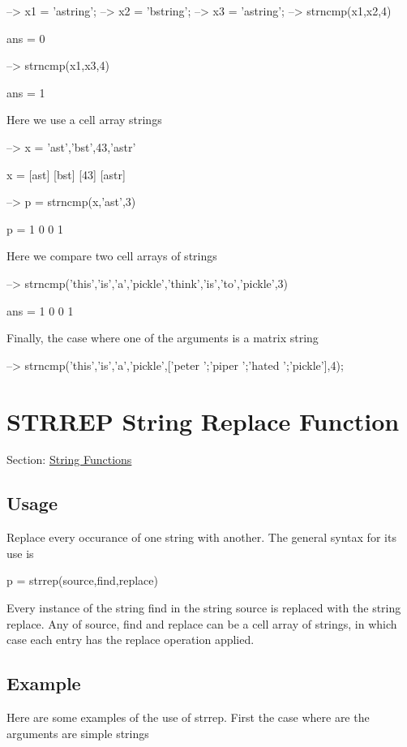 \begin{DoxyVerbInclude}
--> x1 = 'astring';
--> x2 = 'bstring';
--> x3 = 'astring';
--> strncmp(x1,x2,4)

ans = 
 0 

--> strncmp(x1,x3,4)

ans = 
 1 
\end{DoxyVerbInclude}


Here we use a cell array strings


\begin{DoxyVerbInclude}
--> x = {'ast','bst',43,'astr'}

x = 
 [ast] [bst] [43] [astr] 

--> p = strncmp(x,'ast',3)

p = 
 1 0 0 1 
\end{DoxyVerbInclude}


Here we compare two cell arrays of strings


\begin{DoxyVerbInclude}
--> strncmp({'this','is','a','pickle'},{'think','is','to','pickle'},3)

ans = 
 1 0 0 1 
\end{DoxyVerbInclude}


Finally, the case where one of the arguments is a matrix string


\begin{DoxyVerbInclude}
--> strncmp({'this','is','a','pickle'},['peter ';'piper ';'hated ';'pickle'],4);
\end{DoxyVerbInclude}
 \hypertarget{string_strrep}{}\section{S\-T\-R\-R\-E\-P String Replace Function}\label{string_strrep}
Section\-: \hyperlink{sec_string}{String Functions} \hypertarget{vtkwidgets_vtkxyplotwidget_Usage}{}\subsection{Usage}\label{vtkwidgets_vtkxyplotwidget_Usage}
Replace every occurance of one string with another. The general syntax for its use is \begin{DoxyVerb}  p = strrep(source,find,replace)
\end{DoxyVerb}
 Every instance of the string {\ttfamily find} in the string {\ttfamily source} is replaced with the string {\ttfamily replace}. Any of {\ttfamily source}, {\ttfamily find} and {\ttfamily replace} can be a cell array of strings, in which case each entry has the replace operation applied. \hypertarget{variables_struct_Example}{}\subsection{Example}\label{variables_struct_Example}
Here are some examples of the use of {\ttfamily strrep}. First the case where are the arguments are simple strings



